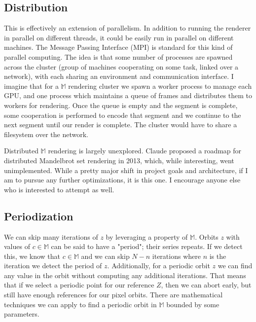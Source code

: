 \documentclass{article}
\begin{document}
\subsection{Distribution}
\par This is effectively an extension of parallelism. In addition to running the renderer in parallel on different threads, it could be easily run in parallel on different machines. The Message Passing Interface (MPI) is standard for this kind of parallel computing. The idea is that some number of processes are spawned across the cluster (group of machines cooperating on some task, linked over a network), with each sharing an environment and communication interface. I imagine that for a $\mathbb{M}$ rendering cluster we spawn a worker process to manage each GPU, and one process which maintains a queue of frames and distributes them to workers for rendering. Once the queue is empty and the segment is complete, some cooperation is performed to encode that segment and we continue to the next segment until our render is complete. The cluster would have to share a filesystem over the network.
\par Distributed $\mathbb{M}$ rendering is largely unexplored. Claude proposed a roadmap for distributed Mandelbrot set rendering in 2013, which, while interesting, went unimplemented\cite{Allen_2013_04}. While a pretty major shift in project goals and architecture, if I am to pursue any further optimizations, it is this one. I encourage anyone else who is interested to attempt as well.
\subsection{Periodization}
\par We can skip many iterations of $z$ by leveraging a property of $\mathbb{M}$. Orbits $z$ with values of $c\in \mathbb{M}$ can be said to have a "period"; their series repeats. If we detect this, we know that $c\in \mathbb{M}$ and we can skip $N - n$ iterations where $n$ is the iteration we detect the period of $z$. Additionally, for a periodic orbit $z$ we can find any value in the orbit without computing any additional iterations. That means that if we select a periodic point for our reference $Z$, then we can abort early, but still have enough references for our pixel orbits. There are mathematical techniques we can apply to find a periodic orbit in $\mathbb{M}$ bounded by some parameters\cite{Thompson_2023}.

\printbibliography
\end{document}
